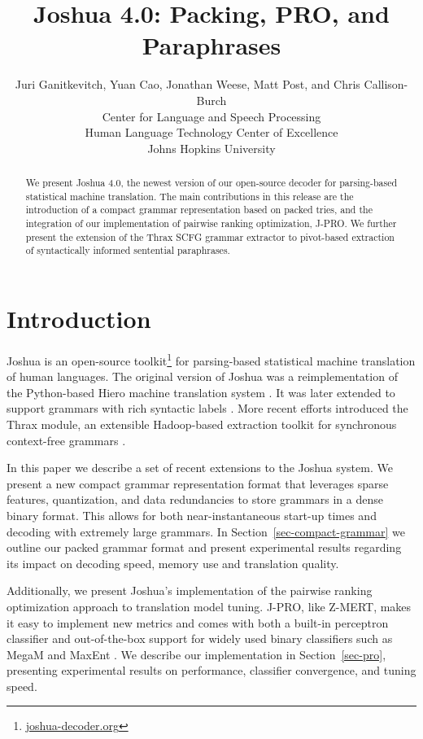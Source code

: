 \documentclass[11pt]{article}
\title{Joshua 4.0: Packing, PRO, and Paraphrases}
\author{Juri Ganitkevitch\aff, Yuan Cao\aff, Jonathan Weese\aff, Matt
  Post\afff, and Chris
  Callison-Burch\aff \\
  \aff Center for Language and Speech Processing \\
  \afff Human Language Technology Center of Excellence \\
  Johns Hopkins University}
\date{}
\begin{document}
\maketitle

\begin{abstract}
  We present Joshua 4.0, the newest version of our open-source decoder
  for parsing-based statistical machine translation. The main
  contributions in this release are the introduction of a compact
  grammar representation based on packed tries, and the integration of
  our implementation of pairwise ranking optimization, J-PRO. We
  further present the extension of the Thrax SCFG grammar extractor to
  pivot-based extraction of syntactically informed sentential
  paraphrases.
\end{abstract}

\section{Introduction}
\label{sec-intro}

Joshua is an open-source toolkit\footnote{\url{joshua-decoder.org}}
for parsing-based statistical machine translation of human
languages. The original version of Joshua \cite{Joshua-WMT} was a
reimplementation of the Python-based Hiero machine translation system
\cite{Chiang2007}. It was later extended to support grammars with rich
syntactic labels \cite{li2010joshua}. More recent efforts introduced
the Thrax module, an extensible Hadoop-based extraction toolkit for
synchronous context-free grammars \cite{Joshua-3.0}.

In this paper we describe a set of recent extensions to the Joshua
system. We present a new compact grammar representation format that
leverages sparse features, quantization, and data redundancies to
store grammars in a dense binary format. This allows for both
near-instantaneous start-up times and decoding with extremely large
grammars. In Section~\ref{sec-compact-grammar} we outline our packed
grammar format and present experimental results regarding its impact
on decoding speed, memory use and translation quality.

Additionally, we present Joshua's implementation of the pairwise
ranking optimization \cite{PRO2011} approach to translation model
tuning. J-PRO, like Z-MERT, makes it easy to implement new metrics and
comes with both a built-in perceptron classifier and out-of-the-box
support for widely used binary classifiers such as MegaM and
MaxEnt \cite{MegaM,MaxEnt}. We describe our implementation in
Section~\ref{sec-pro}, presenting experimental results on performance,
classifier convergence, and tuning speed.
\end{document}
